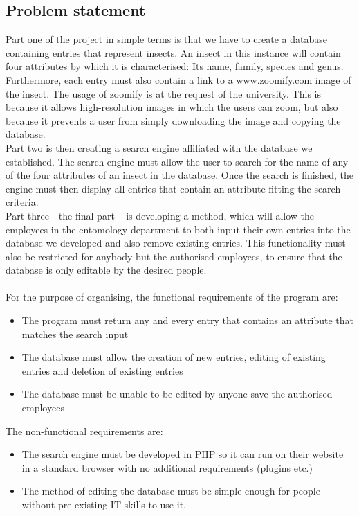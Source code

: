 \documentclass[12pt,a4paper]{article}
\begin{document}
\subsection{Problem statement}
Part one of the project in simple terms is that we have to create a database containing entries that represent insects. An insect in this instance will contain four attributes by which it is characterised: Its name, family, species and genus. Furthermore, each entry must also contain a link to a www.zoomify.com image of the insect. The usage of zoomify is at the request of the university. This is because it allows high-resolution images in which the users can zoom, but also because it prevents a user from simply downloading the image and copying the database. \\
Part two is then creating a search engine affiliated with the database we established. The search engine must allow the user to search for the name of any of the four attributes of an insect in the database. Once the search is finished, the engine must then display all entries that contain an attribute fitting the search-criteria.\\
Part three - the final part – is developing a method, which will allow the employees in the entomology department to both input their own entries into the database we developed and also remove existing entries. This functionality must also be restricted for anybody but the authorised employees, to ensure that the database is only editable by the desired people.\\\\
For the purpose of organising, the functional requirements of the program are:
\begin{itemize}
	\item The program must return any and every entry that contains an attribute that matches the search input
	\item The database must allow the creation of new entries, editing of existing entries and deletion of existing entries
	\item The database must be unable to be edited by anyone save the authorised employees
\end{itemize}
	The non-functional requirements are:\\
\begin{itemize}
	\item The search engine must be developed in PHP so it can run on their website in a standard browser with no additional requirements (plugins etc.)
	\item The method of editing the database must be simple enough for people without pre-existing IT skills to use it.
\end{itemize}
\end{document}
